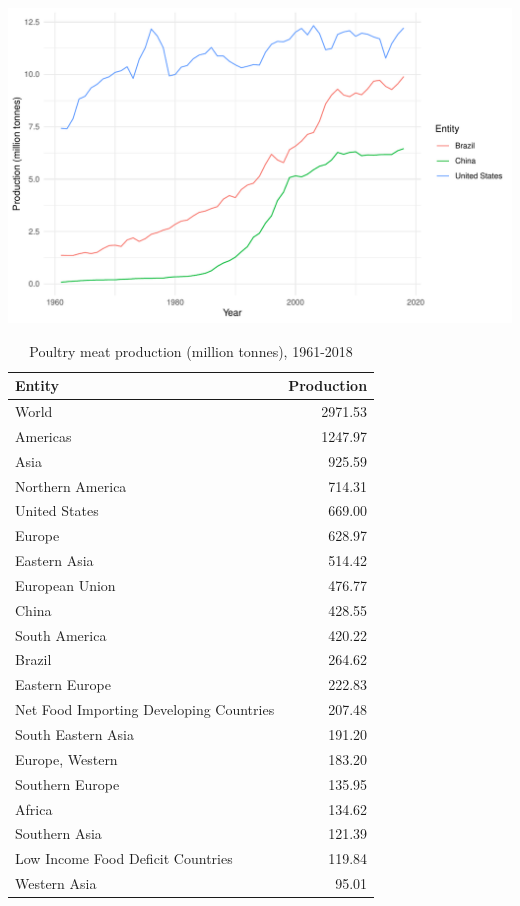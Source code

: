 \documentclass[11pt,a4paper,]{article}
\begin{document}
\includegraphics{report_files/figure-latex/cattle-1.pdf}

\begin{table}

\caption{\label{tab:poultry}Poultry meat production (million tonnes), 1961-2018}
\centering
\begin{tabular}[t]{lr}
\toprule
Entity & Production\\
\midrule
World & 2971.53\\
Americas & 1247.97\\
Asia & 925.59\\
Northern America & 714.31\\
United States & 669.00\\
\addlinespace
Europe & 628.97\\
Eastern Asia & 514.42\\
European Union & 476.77\\
China & 428.55\\
South America & 420.22\\
\addlinespace
Brazil & 264.62\\
Eastern Europe & 222.83\\
Net Food Importing Developing Countries & 207.48\\
South Eastern Asia & 191.20\\
Europe, Western & 183.20\\
\addlinespace
Southern Europe & 135.95\\
Africa & 134.62\\
Southern Asia & 121.39\\
Low Income Food Deficit Countries & 119.84\\
Western Asia & 95.01\\
\bottomrule
\end{tabular}
\end{table}
\end{document}

